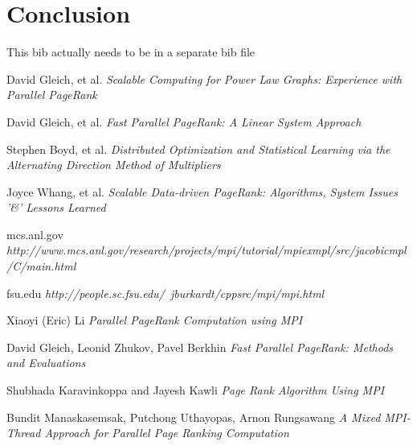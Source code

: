 \documentclass[letterpaper,12pt,onecolumn]{article}
\begin{document}
\section{Conclusion}

This bib actually needs to be in a separate bib file
\begin{thebibliography}{1}

 David Gleich, et al. {\em Scalable Computing for Power Law Graphs: Experience with Parallel PageRank}

 David Gleich, et al. {\em Fast Parallel PageRank: A Linear System Approach} 

 Stephen Boyd, et al. {\em Distributed Optimization and Statistical Learning via the Alternating Direction Method of Multipliers} 

 Joyce Whang, et al. {\em Scalable Data-driven PageRank: Algorithms, System Issues '\&' Lessons Learned}
 
  mcs.anl.gov {\em http://www.mcs.anl.gov/research/projects/mpi/tutorial/mpiexmpl/src/jacobicmpl/C/main.html}
 
  fsu.edu {\em http://people.sc.fsu.edu/~jburkardt/cppsrc/mpi/mpi.html}

  Xiaoyi (Eric) Li  {\em Parallel PageRank Computation using MPI}

  David Gleich, Leonid Zhukov, Pavel Berkhin  {\em Fast Parallel PageRank: Methods and Evaluations}

  Shubhada Karavinkoppa and Jayesh Kawli  {\em Page Rank Algorithm Using MPI}

  Bundit Manaskasemsak, Putchong Uthayopas, Arnon Rungsawang {\em A Mixed MPI-Thread Approach for Parallel Page Ranking Computation}

\end{thebibliography}
\end{document}
